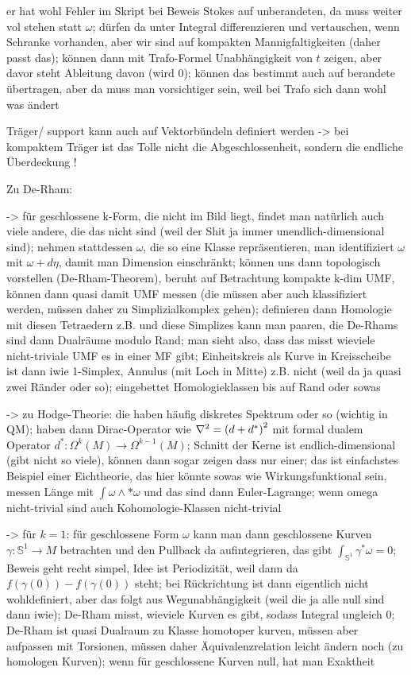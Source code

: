 er hat wohl Fehler im Skript bei Beweis Stokes auf unberandeten, da muss weiter vol stehen statt $\omega$; dürfen da unter Integral differenzieren und vertauschen, wenn Schranke vorhanden, aber wir sind auf kompakten Mannigfaltigkeiten (daher passt das); können dann mit Trafo-Formel Unabhängigkeit von $t$ zeigen, aber davor steht Ableitung davon (wird 0); können das bestimmt auch auf berandete übertragen, aber da muss man vorsichtiger sein, weil bei Trafo sich dann wohl was ändert


Träger/ support kann auch auf Vektorbündeln definiert werden -> bei kompaktem Träger ist das Tolle nicht die Abgeschlossenheit, sondern die endliche Überdeckung !



Zu De-Rham:

-> für geschlossene k-Form, die nicht im Bild liegt, findet man natürlich auch viele andere, die das nicht sind (weil der Shit ja immer unendlich-dimensional sind); nehmen stattdessen $\omega$, die so eine Klasse repräsentieren, man identifiziert $\omega$ mit $\omega + d\eta$, damit man Dimension einschränkt; können uns dann topologisch vorstellen (De-Rham-Theorem), beruht auf Betrachtung kompakte k-dim UMF, können dann quasi damit UMF messen (die müssen aber auch klassifiziert werden, müssen daher zu Simplizialkomplex gehen); definieren dann Homologie mit diesen Tetraedern z.B. und diese Simplizes kann man paaren, die De-Rhams sind dann Dualräume modulo Rand; man sieht also, dass das misst wieviele nicht-triviale UMF es in einer MF gibt; Einheitskreis als Kurve in Kreisscheibe ist dann iwie 1-Simplex, Annulus (mit Loch in Mitte) z.B. nicht (weil da ja quasi zwei Ränder oder so); eingebettet Homologieklassen bis auf Rand oder sowas

-> zu Hodge-Theorie: die haben häufig diskretes Spektrum oder so (wichtig in QM); haben dann Dirac-Operator wie $\laplacian = \qty(d + d^*)^2$ mit formal dualem Operator $d^*: \Omega^k(M) \rightarrow \Omega^{k - 1}(M)$; Schnitt der Kerne ist endlich-dimensional (gibt nicht so viele), können dann sogar zeigen dass nur einer; das ist einfachstes Beispiel einer Eichtheorie, das hier könnte sowas wie Wirkungsfunktional sein, messen Länge mit $\int \omega \wedge *\omega$ und das sind dann Euler-Lagrange; wenn omega nicht-trivial sind auch Kohomologie-Klassen nicht-trivial

-> für $k = 1$: für geschlossene Form $\omega$ kann man dann geschlossene Kurven $\gamma: \mathbb{S}^1 \rightarrow M$ betrachten und den Pullback da aufintegrieren, das gibt $\int_{\mathbb{S}^1} \gamma^*\omega = 0$; Beweis geht recht simpel, Idee ist Periodizität, weil dann da $f(\gamma(0)) - f(\gamma(0))$ steht; bei Rückrichtung ist dann eigentlich nicht wohldefiniert, aber das folgt aus Wegunabhängigkeit (weil die ja alle null sind dann iwie); De-Rham misst, wieviele Kurven es gibt, sodass Integral ungleich 0; De-Rham ist quasi Dualraum zu Klasse homotoper kurven, müssen aber aufpassen mit Torsionen, müssen daher Äquivalenzrelation leicht ändern noch (zu homologen Kurven); wenn für geschlossene Kurven null, hat man Exaktheit


